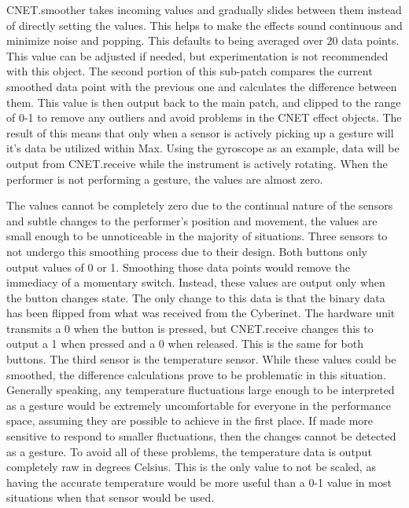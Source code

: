 CNET.smoother takes incoming values and gradually slides between them instead of directly setting the values. This helps to make the effects sound continuous and minimize noise and popping. This defaults to being averaged over 20 data points. This value can be adjusted if needed, but experimentation is not recommended with this object. The second portion of this sub-patch compares the current smoothed data point with the previous one and calculates the difference between them. This value is then output back to the main patch, and clipped to the range of 0-1 to remove any outliers and avoid problems in the CNET effect objects. The result of this means that only when a sensor is actively picking up a gesture will it's data be utilized within Max. Using the gyroscope as an example, data will be output from CNET.receive while the instrument is actively rotating. When the performer is not performing a gesture, the values are almost zero.

The values cannot be completely zero due to the continual nature of the sensors and subtle changes to the performer's position and movement, the values are small enough to be unnoticeable in the majority of situations. Three sensors to not undergo this smoothing process due to their design. Both buttons only output values of 0 or 1. Smoothing those data points would remove the immediacy of a momentary switch. Instead, these values are output only when the button changes state. The only change to this data is that the binary data has been flipped from what was received from the Cyberinet. The hardware unit transmits a 0 when the button is pressed, but CNET.receive changes this to output a 1 when pressed and a 0 when released. This is the same for both buttons. The third sensor is the temperature sensor. While these values could be smoothed, the difference calculations prove to be problematic in this situation. Generally speaking, any temperature fluctuations large enough to be interpreted as a gesture would be extremely uncomfortable for everyone in the performance space, assuming they are possible to achieve in the first place. If made more sensitive to respond to smaller fluctuations, then the changes cannot be detected as a gesture. To avoid all of these problems, the temperature data is output completely raw in degrees Celsius. This is the only value to not be scaled, as having the accurate temperature would be more useful than a 0-1 value in most situations when that sensor would be used.


